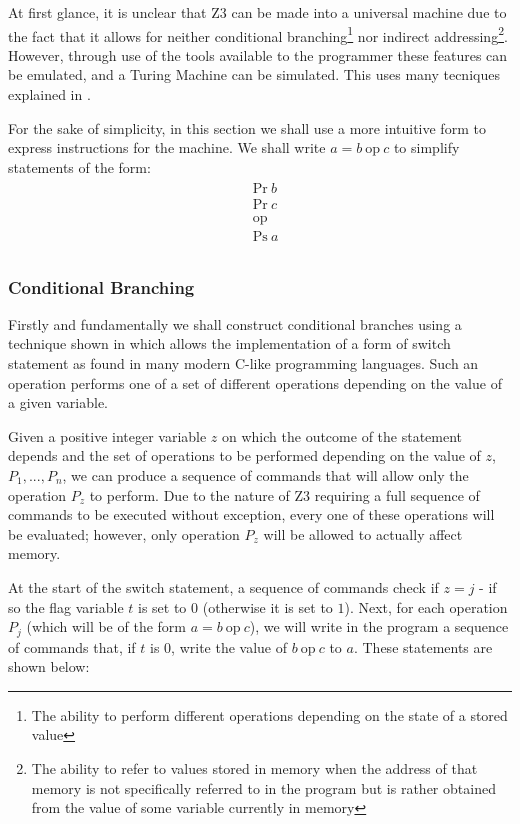 \documentclass[Master.tex]{subfiles}
\begin{document}
At first glance, it is unclear that Z3 can be made into a universal machine due to the fact that it allows for neither conditional branching\footnote{The ability to perform different operations depending on the state of a stored value} nor indirect addressing\footnote{The ability to refer to values stored in memory when the address of that memory is not specifically referred to in the program but is rather obtained from the value of some variable currently in memory}. However, through use of the tools available to the programmer these features can be emulated, and a Turing Machine can be simulated. This uses many tecniques explained in \cite{rojas1998z3universal}.

For the sake of simplicity, in this section we shall use a more intuitive form to express instructions for the machine. We shall write $a = b\ \mathrm{op}\ c$ to simplify statements of the form:
\begin{gather*}
\begin{aligned}
&\mathrm{Pr}\ b\\
&\mathrm{Pr}\ c\\
&\textrm{op}\\ 
&\mathrm{Ps}\ a\\
\end{aligned}
\end{gather*}

\subsubsection{Conditional Branching}

Firstly and fundamentally we shall construct conditional branches using a technique shown in \cite{ibarra1983control} which allows the implementation of a form of switch statement as found in many modern C-like programming languages. Such an operation performs one of a set of different operations depending on the value of a given variable.

Given a positive integer variable $z$ on which the outcome of the statement depends and the set of operations to be performed depending on the value of $z$, $P_1, ... , P_n$, we can produce a sequence of commands that will allow only the operation $P_z$ to perform. Due to the nature of Z3 requiring a full sequence of commands to be executed without exception, every one of these operations will be evaluated; however, only operation $P_z$ will be allowed to actually affect memory.


At the start of the switch statement, a sequence of commands check if $z = j$ - if so the flag variable $t$ is set to $0$ (otherwise it is set to $1$). Next, for each operation $P_j$ (which will be of the form $a = b\ \mathrm{op}\ c$), we will write in the program a sequence of commands that, if $t$ is $0$, write the value of $b\ \mathrm{op}\ c$ to $a$. These statements are shown below:
\end{document}
